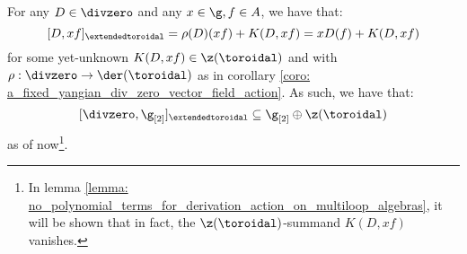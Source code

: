         \begin{lemma} \label{lemma: derivation_action_on_multiloop_algebras}
            For any $D \in \divzero$ and any $x \in \g, f \in A$, we have that:
                $$[D, xf]_{\extendedtoroidal} = \rho(D)(xf) + K( D, xf ) = x D(f) + K( D, xf )$$
            for some yet-unknown $K( D, xf ) \in \z(\toroidal)$ and with $\rho: \divzero \to \der(\toroidal)$ as in corollary \ref{coro: a_fixed_yangian_div_zero_vector_field_action}. As such, we have that:
                $$[\divzero, \g_{[2]}]_{\extendedtoroidal} \subseteq \g_{[2]} \oplus \z(\toroidal)$$
            as of now\footnote{In lemma \ref{lemma: no_polynomial_terms_for_derivation_action_on_multiloop_algebras}, it will be shown that in fact, the $\z(\toroidal)$-summand $K( D, xf )$ vanishes.}.
        \end{lemma}
